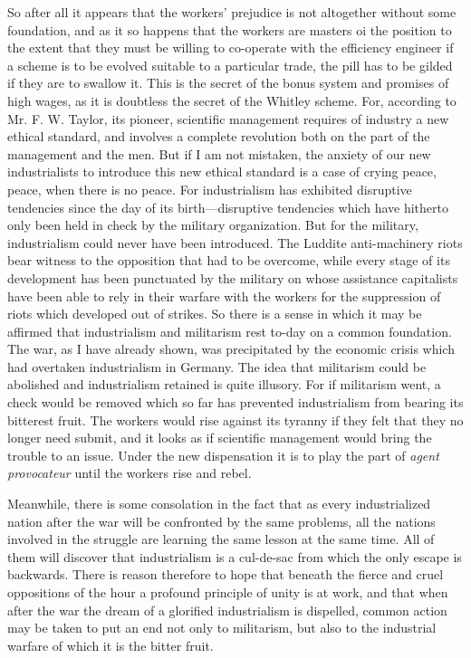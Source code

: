 \documentclass{book}
\begin{document}
So after all it appears that the workers’ prejudice is not altogether without some foundation, and as it so happens that the workers are masters oi the position to the extent that they must be willing to co-operate with the efficiency engineer if a scheme is to be evolved suitable to a particular trade, the pill has to be gilded if they are to swallow it. This is the secret of the bonus system and promises of high wages, as it is doubtless the secret of the Whitley scheme. For, according to Mr. F. W. Taylor, its pioneer, scientific management requires of industry a new ethical standard, and involves a complete revolution both on the part of the management and the men. But if I am not mistaken, the anxiety of our new industrialists to introduce this new ethical standard is a case of crying peace, peace, when there is no peace. For industrialism has exhibited disruptive tendencies since the day of its birth—disruptive tendencies which have hitherto only been held in check by the military organization. But for the military, industrialism could never have been introduced. The Luddite anti-machinery riots bear witness to the opposition that had to be overcome, while every stage of its development has been punctuated by the military on whose assistance capitalists have been able to rely in their warfare with the workers for the suppression of riots which developed out of strikes. So there is a sense in which it may be affirmed that industrialism and militarism rest to-day on a common foundation. The war, as I have already shown, was precipitated by the economic crisis which had overtaken industrialism in Germany. The idea that militarism could be abolished and industrialism retained is quite illusory. For if militarism went, a check would be removed which so far has prevented industrialism from bearing its bitterest fruit. The workers would rise against its tyranny if they felt that they no longer need submit, and it looks as if scientific management would bring the trouble to an issue. Under the new dispensation it is to play the part of \emph{agent provocateur} until the workers rise and rebel.\footnotemark[5]

Meanwhile, there is some consolation in the fact that as every industrialized nation after the war will be confronted by the same problems, all the nations involved in the struggle are learning the same lesson at the same time. All of them will discover that industrialism is a cul-de-sac from which the only escape is backwards. There is reason therefore to hope that beneath the fierce and cruel oppositions of the hour a profound principle of unity is at work, and that when after the war the dream of a glorified industrialism is dispelled, common action may be taken to put an end not only to militarism, but also to the industrial warfare of which it is the bitter fruit.
\end{document}
